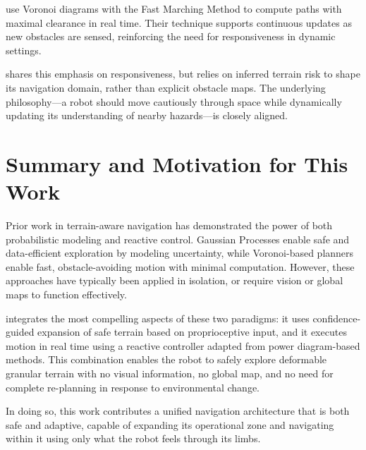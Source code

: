 \textcite{garrido2015mobilerobotpathplanning} use Voronoi diagrams with the Fast Marching Method to compute paths with maximal clearance in real time. Their technique supports continuous updates as new obstacles are sensed, reinforcing the need for responsiveness in dynamic settings.

\algoname{} shares this emphasis on responsiveness, but relies on inferred terrain risk to shape its navigation domain, rather than explicit obstacle maps. The underlying philosophy—a robot should move cautiously through space while dynamically updating its understanding of nearby hazards—is closely aligned.

\section{Summary and Motivation for This Work}

Prior work in terrain-aware navigation has demonstrated the power of both probabilistic modeling and reactive control. Gaussian Processes enable safe and data-efficient exploration by modeling uncertainty, while Voronoi-based planners enable fast, obstacle-avoiding motion with minimal computation. However, these approaches have typically been applied in isolation, or require vision or global maps to function effectively.

\algoname{} integrates the most compelling aspects of these two paradigms: it uses confidence-guided expansion of safe terrain based on proprioceptive input, and it executes motion in real time using a reactive controller adapted from power diagram-based methods. This combination enables the robot to safely explore deformable granular terrain with no visual information, no global map, and no need for complete re-planning in response to environmental change.

In doing so, this work contributes a unified navigation architecture that is both safe and adaptive, capable of expanding its operational zone and navigating within it using only what the robot feels through its limbs.
